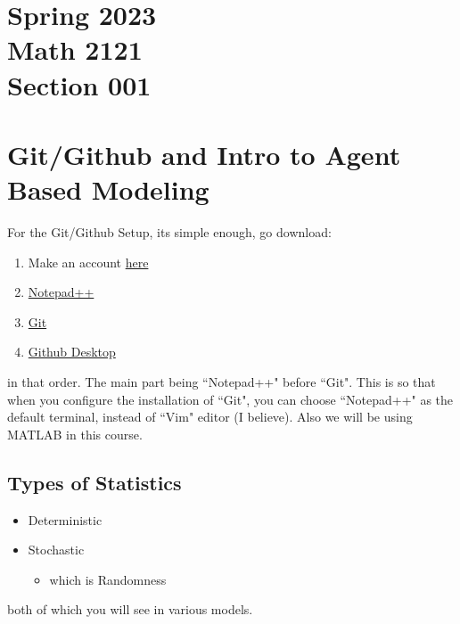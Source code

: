 \documentclass[12pt]{book}
\begin{document}
%
\chapter*{\center \normalsize Spring 2023\\
Math 2121\\
Section 001\\}
%
















%
\tableofcontents
%
\mainmatter
%













\chapter{Git/Github and Intro to Agent Based Modeling}
For the Git/Github Setup, its simple enough, go download:
\begin{enumerate} 
	\item Make an account \href{https://github.com/}{here}
	\item \href{https://notepad-plus-plus.org/downloads/}{Notepad++}
	\item \href{https://git-scm.com/downloads}{Git}
	\item \href{https://desktop.github.com/}{Github Desktop}
\end{enumerate}
in that order. The main part being ``Notepad++" before ``Git". This is so that when you configure the installation of ``Git", you can choose ``Notepad++" as the default terminal, instead of ``Vim" editor (I believe). Also we will be using MATLAB in this course.

\newpage 
\section{Types of Statistics}
\begin{itemize}
	\item Deterministic
	\item Stochastic
	\begin{itemize}
		\item which is Randomness
	\end{itemize}
\end{itemize}
both of which you will see in various models.
\end{document}
